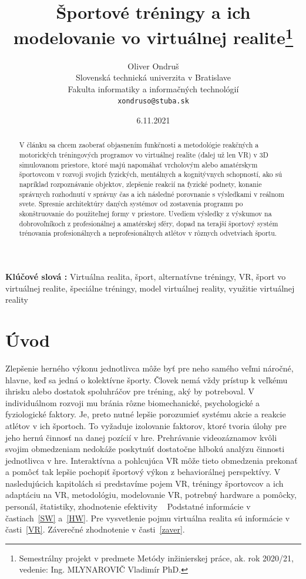 \documentclass[10pt,twoside,slovak,a4paper]{article}										%
\title{Športové tréningy a ich modelovanie vo virtuálnej realite\thanks{Semestrálny projekt v predmete Metódy inžinierskej práce, ak. rok 2020/21, vedenie: Ing. MLYNAROVIČ Vladimír  PhD.}}
\author{Oliver Ondruš\\[2pt]
	{\small Slovenská technická univerzita v Bratislave}\\
	{\small Fakulta informatiky a informačných technológií}\\
	{\small \texttt{xondruso@stuba.sk}}
	}
\date{\small 6.11.2021}
\begin{document}
\maketitle

\begin{abstract}
V článku sa chcem zaoberať objasnením funkčnosti a metodológie reakčných a motorických tréningových programov vo virtuálnej realite (ďalej už len VR) v 3D simulovanom priestore, ktoré majú napomáhať vrcholovým alebo amatérskym športovcom v rozvoji svojich fyzických, mentálnych a kognitývnych schopností, ako sú napríklad rozpoznávanie objektov, zlepšenie reakcií na fyzické podnety, konanie správnych rozhodnutí v správny čas a ich následné porovnanie s výsledkami v reálnom svete. Spresnie architektúry daných systémov od zostavenia programu po skonštruovanie do použiteľnej formy v priestore. Uvediem výsledky z výskumov na dobrovoľníkoch z profesionálnej a amatérskej sféry, dopad na terajší športový systém trénovania profesionálnych a neprofesionálnych atlétov v rôznych odvetviach športu.
\end{abstract}
\textbf{Klúčové slová :}
Virtuálna realita, šport, alternatívne tréningy, VR, šport vo virtuálnej realite, špeciálne tréningy, model virtuálnej reality, využitie virtuálnej reality

\section{Úvod}
Zlepšenie herného výkonu jednotlivca môže byť pre neho samého veľmi náročné, hlavne, keď sa jedná o kolektívne športy. Človek nemá vždy prístup k veľkému ihrisku alebo dostatok spoluhráčov pre tréning, aký by potreboval. V individuálnom rozvoji mu bránia rôzne biomechanické, psychologické a fyziologické faktory. Je, preto nutné lepšie porozumieť systému akcie a reakcie atlétov v ich športoch. To vyžaduje izolovanie faktorov, ktoré tvoria úlohy pre jeho hernú činnosť na danej pozícií v hre. Prehrávanie videozáznamov kvôli svojim obmedzeniam nedokáže poskytnúť dostatočne hlbokú analýzu činnosti jednotlivca v hre. Interaktívna a pohlcujúca VR môže tieto obmedzenia prekonať a pomôcť tak lepšie pochopiť športový výkon z behaviorálnej perspektívy. V nasledujúcich kapitolách si predstavíme pojem VR, tréningy športovcov a ich adaptáciu na VR, metodológiu, modelovanie VR, potrebný hardware a pomôcky, personál, štatistiky, zhodnotenie efektivity ~\cite{Hlavny:zdroj}
Podstatné informácie v častiach~\ref{SW} a~\ref{HW}. Pre vysvetlenie pojmu virtuálna realita sú informácie v časti~\ref{VR}. 
Záverečné zhodnotenie v časti~\ref{zaver}.
  
\end{document}
